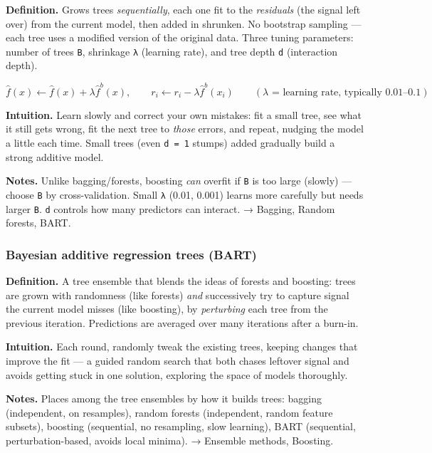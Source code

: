 \documentclass[
  10pt,
  letterpaper,
  onecolumn]{article}
\begin{document}
\textbf{Definition.} Grows trees \emph{sequentially}, each one fit to
the \emph{residuals} (the signal left over) from the current model, then
added in shrunken. No bootstrap sampling --- each tree uses a modified
version of the original data. Three tuning parameters: number of trees
\texttt{B}, shrinkage \texttt{λ} (learning rate), and tree depth
\texttt{d} (interaction depth).

\begin{equation*}
\hat f(x)\leftarrow \hat f(x)+\lambda\hat f^{b}(x),
\qquad
r_i\leftarrow r_i-\lambda\hat f^{b}(x_i)
\qquad (\lambda \text{ = learning rate, typically } 0.01\text{--}0.1)
\end{equation*}

\textbf{Intuition.} Learn slowly and correct your own mistakes: fit a
small tree, see what it still gets wrong, fit the next tree to
\emph{those} errors, and repeat, nudging the model a little each time.
Small trees (even \texttt{d\ =\ 1} stumps) added gradually build a
strong additive model.

\textbf{Notes.} Unlike bagging/forests, boosting \emph{can} overfit if
\texttt{B} is too large (slowly) --- choose \texttt{B} by
cross-validation. Small \texttt{λ} (0.01, 0.001) learns more carefully
but needs larger \texttt{B}. \texttt{d} controls how many predictors can
interact. → Bagging, Random forests, BART.

\hypertarget{bayesian-additive-regression-trees-bart}{%
\subsubsection{Bayesian additive regression trees
(BART)}\label{bayesian-additive-regression-trees-bart}}

\textbf{Definition.} A tree ensemble that blends the ideas of forests
and boosting: trees are grown with randomness (like forests) \emph{and}
successively try to capture signal the current model misses (like
boosting), by \emph{perturbing} each tree from the previous iteration.
Predictions are averaged over many iterations after a burn-in.

\textbf{Intuition.} Each round, randomly tweak the existing trees,
keeping changes that improve the fit --- a guided random search that
both chases leftover signal and avoids getting stuck in one solution,
exploring the space of models thoroughly.

\textbf{Notes.} Places among the tree ensembles by how it builds trees:
bagging (independent, on resamples), random forests (independent, random
feature subsets), boosting (sequential, no resampling, slow learning),
BART (sequential, perturbation-based, avoids local minima). → Ensemble
methods, Boosting.
\end{document}
